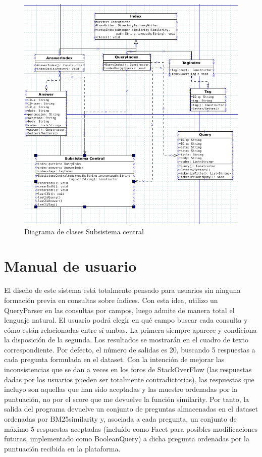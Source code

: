 \begin{figure}[H] %
	\centering
	\includegraphics[scale=0.5]{dcsc.png}  %
	\caption{Diagrama de clases Subsistema central} 
\end{figure}





\newpage
\section{Manual de usuario}

El diseño de este sistema está totalmente pensado para usuarios sin ninguna formación previa en consultas sobre índices. Con esta idea, utilizo un QueryParser en las consultas por campos, luego admite de manera total el lenguaje natural. El usuario podrá elegir en qué campo buscar cada consulta y cómo están relacionadas entre sí ambas. La primera siempre aparece y condiciona la disposición de la segunda. Los resultados se mostrarán en el cuadro de texto correspondiente. Por defecto, el número de salidas es 20, buscando 5 respuestas a cada pregunta formulada en el dataset. Con la intención de mejorar las inconsistencias que se dan a veces en los foros de StackOverFlow (las respuestas dadas por los usuarios pueden ser totalmente contradictorias), las respuestas que incluyo son aquellas que han sido aceptadas y las muestro ordenadas por la puntuación, no por el score que me devuelve la función similarity. Por tanto, la salida del programa devuelve un conjunto de preguntas almacenadas en el dataset ordenadas por BM25similarity y, asociada a cada pregunta, un conjunto de máximo 5 respuestas aceptadas (incluído como Facet para posibles modificaciones futuras, implementado como BooleanQuery) a dicha pregunta ordenadas por la puntuación recibida en la plataforma.
\\

